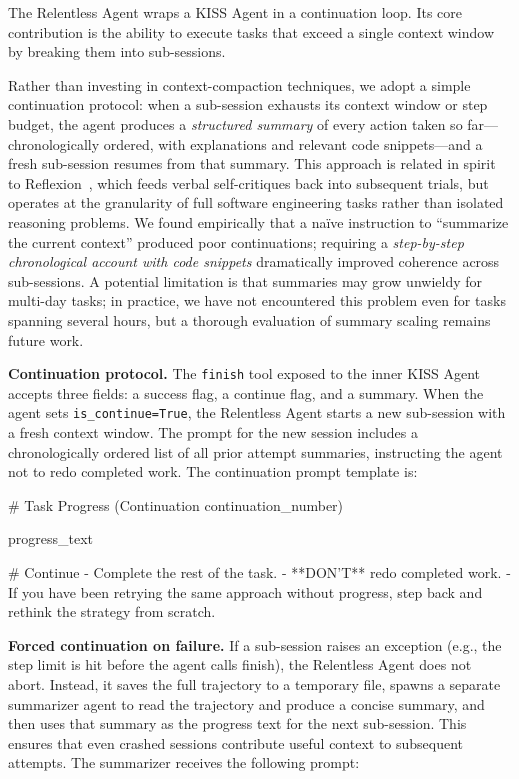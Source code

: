 \documentclass{article}
\begin{document}
The Relentless Agent wraps a KISS Agent in a continuation loop.  Its
core contribution is the ability to execute tasks that exceed a single
context window by breaking them into sub-sessions.

Rather than investing in context-compaction techniques, we adopt a
simple continuation protocol: when a sub-session exhausts its context
window or step budget, the agent produces a \emph{structured summary}
of every action taken so far---chronologically ordered, with
explanations and relevant code snippets---and a fresh sub-session
resumes from that summary.  This approach is related in spirit to
Reflexion~\citep{shinn2023reflexion}, which feeds verbal
self-critiques back into subsequent trials, but operates at the
granularity of full software engineering tasks rather than isolated
reasoning problems.  We found empirically that a na\"ive instruction
to ``summarize the current context'' produced poor continuations;
requiring a \emph{step-by-step chronological account with code
  snippets} dramatically improved coherence across sub-sessions.
A potential limitation is that summaries may grow unwieldy for
multi-day tasks; in practice, we have not encountered this problem
even for tasks spanning several hours, but a thorough evaluation of
summary scaling remains future work.

\textbf{Continuation protocol.}  The \texttt{finish} tool exposed to
the inner KISS Agent accepts three fields: a success flag, a continue
flag, and a summary.  When the agent sets \texttt{is\_continue=True},
the Relentless Agent starts a new sub-session with a fresh context
window.  The prompt for the new session includes a chronologically
ordered list of all prior attempt summaries, instructing the agent not
to redo completed work.  The continuation prompt template is:

\begin{prompt}
# Task Progress (Continuation {continuation_number})

{progress_text}

# Continue
- Complete the rest of the task.
- **DON'T** redo completed work.
- If you have been retrying the same approach without progress,
  step back and rethink the strategy from scratch.
\end{prompt}

\textbf{Forced continuation on failure.}  If a sub-session raises an
exception (e.g., the step limit is hit before the agent calls finish),
the Relentless Agent does not abort.  Instead, it saves the full
trajectory to a temporary file, spawns a separate summarizer agent to
read the trajectory and produce a concise summary, and then uses that
summary as the progress text for the next sub-session.  This ensures
that even crashed sessions contribute useful context to subsequent
attempts.  The summarizer receives the following prompt:
\end{document}
